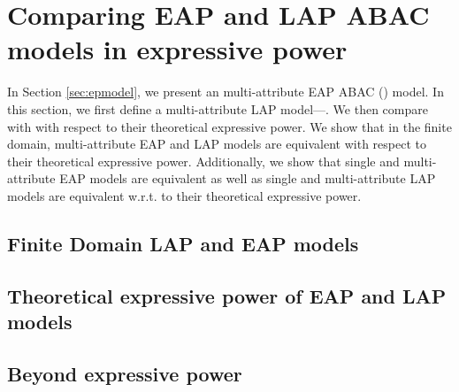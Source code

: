 \chapter{Comparing EAP and LAP ABAC models in expressive power}
	In Section \ref{sec:epmodel}, we present an multi-attribute EAP ABAC (\EPMNModel{}) model. In this section, we first define a multi-attribute LAP model---\LPMN{}. We then compare \EPMNModel{} with  \LPMN{} with respect to their theoretical expressive power.  We show that in the finite domain, multi-attribute EAP and LAP models are equivalent with respect to their theoretical expressive power. Additionally, we show that single and multi-attribute EAP models are equivalent as well as single and multi-attribute LAP models are equivalent w.r.t. to their theoretical expressive power. 
	

\section{Finite Domain LAP and EAP models}
	
\section{Theoretical expressive power of EAP and LAP models}
	
\section{Beyond expressive power}
	